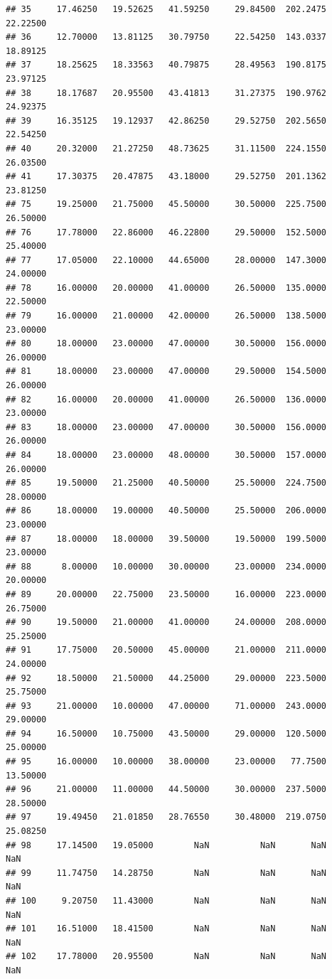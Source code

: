 \documentclass[]{article}
\begin{document}
\begin{verbatim}
## 35     17.46250   19.52625   41.59250     29.84500  202.2475    22.22500
## 36     12.70000   13.81125   30.79750     22.54250  143.0337    18.89125
## 37     18.25625   18.33563   40.79875     28.49563  190.8175    23.97125
## 38     18.17687   20.95500   43.41813     31.27375  190.9762    24.92375
## 39     16.35125   19.12937   42.86250     29.52750  202.5650    22.54250
## 40     20.32000   21.27250   48.73625     31.11500  224.1550    26.03500
## 41     17.30375   20.47875   43.18000     29.52750  201.1362    23.81250
## 75     19.25000   21.75000   45.50000     30.50000  225.7500    26.50000
## 76     17.78000   22.86000   46.22800     29.50000  152.5000    25.40000
## 77     17.05000   22.10000   44.65000     28.00000  147.3000    24.00000
## 78     16.00000   20.00000   41.00000     26.50000  135.0000    22.50000
## 79     16.00000   21.00000   42.00000     26.50000  138.5000    23.00000
## 80     18.00000   23.00000   47.00000     30.50000  156.0000    26.00000
## 81     18.00000   23.00000   47.00000     29.50000  154.5000    26.00000
## 82     16.00000   20.00000   41.00000     26.50000  136.0000    23.00000
## 83     18.00000   23.00000   47.00000     30.50000  156.0000    26.00000
## 84     18.00000   23.00000   48.00000     30.50000  157.0000    26.00000
## 85     19.50000   21.25000   40.50000     25.50000  224.7500    28.00000
## 86     18.00000   19.00000   40.50000     25.50000  206.0000    23.00000
## 87     18.00000   18.00000   39.50000     19.50000  199.5000    23.00000
## 88      8.00000   10.00000   30.00000     23.00000  234.0000    20.00000
## 89     20.00000   22.75000   23.50000     16.00000  223.0000    26.75000
## 90     19.50000   21.00000   41.00000     24.00000  208.0000    25.25000
## 91     17.75000   20.50000   45.00000     21.00000  211.0000    24.00000
## 92     18.50000   21.50000   44.25000     29.00000  223.5000    25.75000
## 93     21.00000   10.00000   47.00000     71.00000  243.0000    29.00000
## 94     16.50000   10.75000   43.50000     29.00000  120.5000    25.00000
## 95     16.00000   10.00000   38.00000     23.00000   77.7500    13.50000
## 96     21.00000   11.00000   44.50000     30.00000  237.5000    28.50000
## 97     19.49450   21.01850   28.76550     30.48000  219.0750    25.08250
## 98     17.14500   19.05000        NaN          NaN       NaN         NaN
## 99     11.74750   14.28750        NaN          NaN       NaN         NaN
## 100     9.20750   11.43000        NaN          NaN       NaN         NaN
## 101    16.51000   18.41500        NaN          NaN       NaN         NaN
## 102    17.78000   20.95500        NaN          NaN       NaN         NaN

\end{verbatim}
\end{document}

